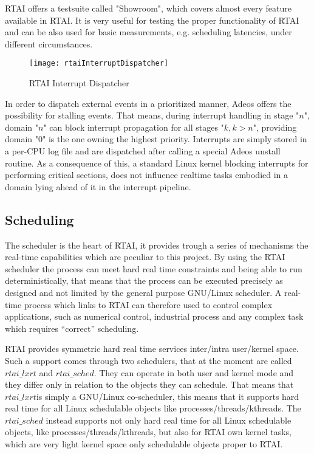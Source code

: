 RTAI offers a testsuite called "Showroom", which covers almost every feature available in
RTAI. It is very useful for testing the proper functionality of RTAI and can be also used for
basic measurements, e.g. scheduling latencies, under different circumstances.
\begin{figure}[!htbp]
    \texttt{[image: rtaiInterruptDispatcher]}
    \caption{RTAI Interrupt Dispatcher\cite{rtaiPresentation}}\label{fig:rtai-interrupt-dispatcher}
\end{figure}
In order to dispatch external events in a prioritized manner, Adeos offers the possibility for stalling events. That means, during interrupt handling in stage "$ n $", domain "$ n $" can block interrupt propagation for all stages "$ k, k > n $", providing domain "$ 0 $" is the one owning the highest priority.
Interrupts are simply stored in a per-CPU log file and are dispatched after calling a special Adeos unstall routine. As a consequence of this, a standard Linux kernel blocking interrupts for performing critical sections, does not influence realtime tasks embodied in a domain lying ahead of it in the interrupt pipeline.

\subsection{Scheduling}
The scheduler is the heart of RTAI, it provides trough a series of mechanisms the real-time capabilities which are peculiar to this project. By using the RTAI scheduler the process can meet hard real time constraints and being able to run deterministically, that means that the process can be executed precisely as designed and not limited by the general purpose GNU/Linux scheduler. A real-time process which links to RTAI can therefore used to control complex applications, such as numerical control, industrial process and any complex task which requires “correct” scheduling. 

RTAI provides symmetric hard real time services inter/intra user/kernel space. Such a support comes through two schedulers, that at the moment are called $ rtai\_lxrt $ and $ rtai\_sched $. They can operate in both user and kernel mode and they differ only in relation to the objects they can schedule. That means that $ rtai\_lxrt  $is simply a GNU/Linux co-scheduler, this means that it supports hard real time for all Linux schedulable objects like processes/threads/kthreads. The $ rtai\_sched $ instead supports not only hard real time for all Linux schedulable objects, like processes/threads/kthreads, but also for RTAI own kernel tasks, which are very light kernel space only schedulable objects proper to RTAI.

